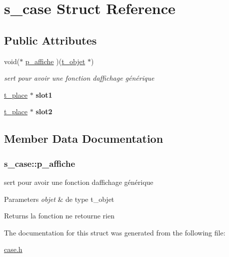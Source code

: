 \hypertarget{structs__case}{}\section{s\+\_\+case Struct Reference}
\label{structs__case}
\subsection*{Public Attributes}
\begin{DoxyCompactItemize}
\item 
void($\ast$ \hyperlink{structs__case_ab72efb72d5e1031d46e96c61c9c2e123}{p\+\_\+affiche} )(\hyperlink{structs__objet}{t\+\_\+objet} $\ast$)
\begin{DoxyCompactList}\small\item\em sert pour avoir une fonction d\textquotesingle{}affichage générique \end{DoxyCompactList}\item 
\hyperlink{structs__place}{t\+\_\+place} $\ast$ {\bfseries slot1}\hypertarget{structs__case_a88358de79f1bfb51549cd344a28fcff6}{}\label{structs__case_a88358de79f1bfb51549cd344a28fcff6}

\item 
\hyperlink{structs__place}{t\+\_\+place} $\ast$ {\bfseries slot2}\hypertarget{structs__case_a101455287fd931e3a5f0ff3ffade4cfc}{}\label{structs__case_a101455287fd931e3a5f0ff3ffade4cfc}

\end{DoxyCompactItemize}


\subsection{Member Data Documentation}
\subsubsection[{\texorpdfstring{p\+\_\+affiche}{p_affiche}}]{\setlength{\rightskip}{0pt plus 5cm}s\+\_\+case\+::p\+\_\+affiche}\hypertarget{structs__case_ab72efb72d5e1031d46e96c61c9c2e123}{}\label{structs__case_ab72efb72d5e1031d46e96c61c9c2e123}


sert pour avoir une fonction d\textquotesingle{}affichage générique 


\begin{DoxyParams}{Parameters}
{\em objet} & de type t\+\_\+objet \\
\hline
\end{DoxyParams}
\begin{DoxyReturn}{Returns}
la fonction ne retourne rien 
\end{DoxyReturn}


The documentation for this struct was generated from the following file\+:\begin{DoxyCompactItemize}
\item 
\hyperlink{case_8h}{case.\+h}\end{DoxyCompactItemize}

